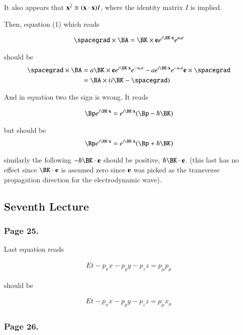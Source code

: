 It also appears that $\mathbf{x}^2 \equiv (\mathbf{x} \cdot \mathbf{x}) I$, where the identity matrix $I$ is implied.

Then, equation (1) which reads 

\begin{align*}
\spacegrad \cross \BA = \BK \cross \Be e^{i \BK \cdot \Bx} e^{i \omega t}
\end{align*}

should be
\begin{align*}
\spacegrad \cross \BA 
&= a \BK \cross \Be e^{i \BK \cdot \Bx} e^{-i \omega t} 
- a e^{i \BK \cdot \Bx} e^{-i \omega t} \Be \cross \spacegrad \\
&= \BA \cross (i \BK - \spacegrad )
\end{align*}

And in equation two the sign is wrong.  It reads

\begin{align*}
\Bp e^{i \BK \cdot \Bx} = e^{i \BK \cdot \Bx} (\Bp - \hbar \BK)
\end{align*}

but should be
\begin{align*}
\Bp e^{i \BK \cdot \Bx} = e^{i \BK \cdot \Bx} (\Bp + \hbar \BK)
\end{align*}

similarly the following $-\hbar \BK \cdot \Be$ should be positive, $\hbar \BK \cdot \Be$.  (this last has no effect since $\BK \cdot \Be$ is assumed zero since $\mathbf{e}$ was picked as the transverse propagation direction for the electrodynamic wave).

\subsection{Seventh Lecture}
\subsubsection{Page 25.}

Last equation reads

\begin{align*}
E t - p_x x - p_y y - p_z z = p_\mu p_\mu
\end{align*}

should be

\begin{align*}
E t - p_x x - p_y y - p_z z = p_\mu x_\mu
\end{align*}

\subsubsection{Page 26.}

